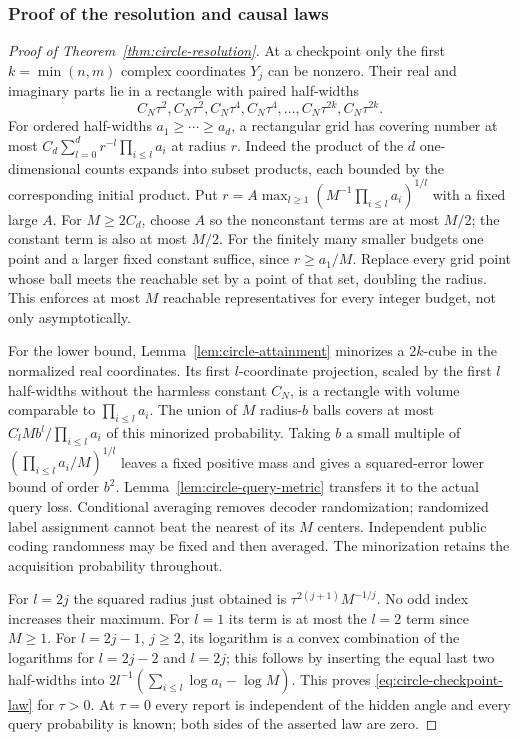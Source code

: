 \subsubsection{Proof of the resolution and causal laws}
\begin{proof}[Proof of Theorem~\ref{thm:circle-resolution}]
At a checkpoint only the first $k=\min(n,m)$ complex coordinates $Y_j$
can be nonzero. Their real and imaginary parts lie in a rectangle with
paired half-widths
\[
 C_N\tau^2,C_N\tau^2,C_N\tau^4,C_N\tau^4,
             \ldots,C_N\tau^{2k},C_N\tau^{2k}.
\]
For ordered half-widths $a_1\ge\cdots\ge a_d$, a rectangular grid
has covering number at most
$C_d\sum_{l=0}^d r^{-l}\prod_{i\le l}a_i$ at radius $r$.
Indeed the product of the $d$ one-dimensional counts expands into
subset products, each bounded by the corresponding initial product.
Put $r=A\max_{l\ge1}(M^{-1}\prod_{i\le l}a_i)^{1/l}$ with a
fixed large $A$. For $M\ge2C_d$, choose $A$ so the nonconstant
terms are at most $M/2$; the constant term is also at most $M/2$.
For the finitely many smaller budgets one point and a larger fixed
constant suffice, since $r\ge a_1/M$. Replace every grid point whose
ball meets the reachable set by a point of that set, doubling the radius.
This enforces at most $M$ reachable representatives for every integer
budget, not only asymptotically.

For the lower bound, Lemma~\ref{lem:circle-attainment} minorizes a
$2k$-cube in the normalized real coordinates. Its first $l$-coordinate
projection, scaled by the first $l$ half-widths without the harmless
constant $C_N$, is a rectangle with volume comparable to
$\prod_{i\le l}a_i$. The union of $M$ radius-$b$ balls covers at
most $C_lMb^l/\prod_{i\le l}a_i$ of this minorized probability.
Taking $b$ a small multiple of $(\prod_{i\le l}a_i/M)^{1/l}$
leaves a fixed positive mass and gives a squared-error lower bound of
order $b^2$. Lemma~\ref{lem:circle-query-metric} transfers it to the
actual query loss. Conditional averaging removes decoder randomization;
randomized label assignment cannot beat the nearest of its $M$ centers.
Independent public coding randomness may be fixed and then averaged.
The minorization retains the acquisition probability throughout.

For $l=2j$ the squared radius just obtained is
$\tau^{2(j+1)}M^{-1/j}$. No odd index increases their maximum.
For $l=1$ its term is at most the $l=2$ term since $M\ge1$.
For $l=2j-1$, $j\ge2$, its logarithm is a convex combination of
the logarithms for $l=2j-2$ and $l=2j$; this follows by inserting
the equal last two half-widths into
$2l^{-1}(\sum_{i\le l}\log a_i-\log M)$.
This proves \eqref{eq:circle-checkpoint-law} for $\tau>0$.
At $\tau=0$ every report is independent of the hidden angle and every
query probability is known; both sides of the asserted law are zero.


\end{proof}
